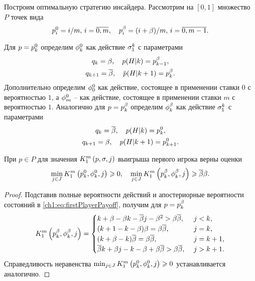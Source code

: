 {Построим оптимальную стратегию инсайдера. Рассмотрим на $[0,1]$ множество $P$ точек вида
\[
\pEven[i] = i/m, \, i = \overline{0, m}, \quad \pOdd[i] = (i + \Co)/m, \, i =
\overline{0, m - 1}.
\]

Для $p = \pEven$ определим $\fEven$ как действие $\fGeneral{k}$ с параметрами
\begin{gather*}
  q_k = \Co, \quad p(H|k) = \pOdd[k-1],\\
  q_{k+1} = \DCo, \quad \p(H|k + 1) = \pOdd[k].
\end{gather*}
Дополнительно определим $\fEven[0]$ как действие, состоящее в применении ставки $0$ с вероятностью $1$, а $\fEven[m]$ -- как действие, состоящее в применении ставки $m$ с вероятностью $1$.
Аналогично для $p = \pOdd$ определим $\fOdd$ как действие $\fGeneral{k}$ с параметрами
\begin{gather*}
  q_k = \DCo, \quad p(H|k) = \pEven[k],\\
  q_{k+1} = \Co, \quad p(H|k + 1) = \pEven[k+1].
\end{gather*}

\begin{proposition}
  При $p \in P$ для значения $\firstPlayerPayoff{1}{p}{\sigma}{j}$ выигрыша первого игрока верны оценки
  \begin{equation}
    \label{ch1:eq:lowerBound:inequalities}
    \min_{j \in J}
    \firstPlayerPayoff{1}{\pEven}{\fEven}{j} \geq 0,
    \quad
    \min_{j \in J}
    \firstPlayerPayoff{1}{\pOdd}{\fOdd}{j} \geq \DCo\Co.
  \end{equation}
\end{proposition}
\begin{proof}
  Подставив полные вероятности действий и апостериорные вероятности состояний в \eqref{ch1:eq:firstPlayerPayoff}, получим для $p = \pOdd[k]$
  \begin{equation*}
    \firstPlayerPayoff{1}{\pOdd}{\fOdd}{j} = \begin{cases}
      k + \Co - \Co k - \DCo j - \Co^2 > \Co \DCo,\ & j < k,\\
      (k + 1 - k - \Co) \Co = \Co \DCo,\ & j = k,\\
      (k + \Co - k) \DCo = \Co \DCo,\ & j = k+1,\\
      \DCo k + \Co j - k - \Co + \Co \DCo > \Co \DCo,\ & j > k+1.
    \end{cases}
  \end{equation*}
  Справедливость неравенства $\min_{j \in J} \firstPlayerPayoff{1}{\pEven}{\fEven}{j} \geq 0$ устанавливается аналогично.
\end{proof}

}
